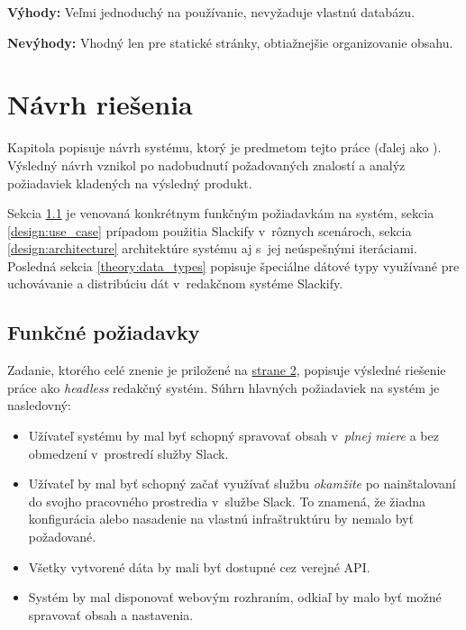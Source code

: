 \noindent \textbf{Výhody:} Veľmi jednoduchý na používanie, nevyžaduje vlastnú databázu.

\medskip

\noindent \textbf{Nevýhody:} Vhodný len pre statické stránky, obtiažnejšie organizovanie obsahu.

\chapter{Návrh riešenia}
\label{design}
Kapitola popisuje návrh systému, ktorý je predmetom tejto práce (ďalej ako ). Výsledný návrh vznikol po nadobudnutí požadovaných znalostí a analýz požiadaviek kladených na výsledný produkt.

Sekcia \ref{design:assignment} je venovaná konkrétnym funkčným požiadavkám na systém, sekcia \ref{design:use_case} prípadom použitia Slackify v~rôznych scenároch, sekcia \ref{design:architecture} architektúre systému aj s~jej neúspešnými iteráciami. Posledná sekcia \ref{theory:data_types} popisuje špeciálne dátové typy využívané pre uchovávanie a distribúciu dát v~redakčnom systéme Slackify.

\section{Funkčné požiadavky}
\label{design:assignment}
Zadanie, ktorého celé znenie je priložené na \hyperlink{page.2}{strane 2}, popisuje výsledné riešenie práce ako \emph{headless} redakčný systém. Súhrn hlavných požiadaviek na systém je nasledovný:

\begin{itemize}
	\item Užívateľ systému by mal byť schopný spravovať obsah v~\emph{plnej miere} a bez obmedzení v~prostredí služby Slack.
	\item Užívateľ by mal byť schopný začať využívať službu \emph{okamžite} po nainštalovaní do svojho pracovného prostredia v~službe Slack. To znamená, že žiadna konfigurácia alebo nasadenie na vlastnú infraštruktúru by nemalo byť požadované.
	\item Všetky vytvorené dáta by mali byť dostupné cez verejné API.
	\item Systém by mal disponovať webovým rozhraním, odkiaľ by malo byť možné spravovať obsah a nastavenia.
\end{itemize}

